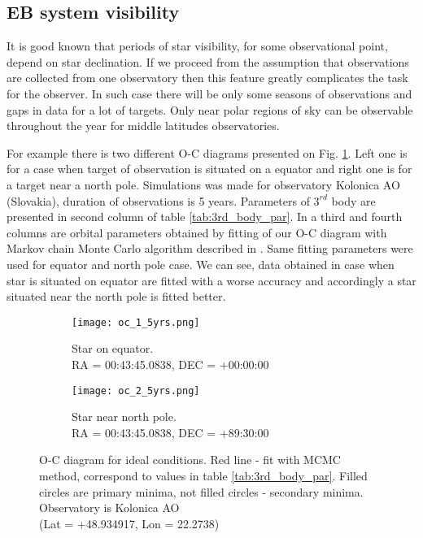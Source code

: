 \subsection{EB system visibility}

It is good known that periods of star visibility, for some observational point, depend on star declination.
If we proceed from the assumption that observations are collected from one observatory then this feature greatly complicates the task for the observer. In such case there will be only some seasons of observations and gaps in data for a lot of targets. Only near polar regions of sky can be observable throughout the year for middle latitudes observatories.

For example there is two different O-C diagrams presented on Fig. \ref{fig:oc_1}. Left one is for a case when 
target of observation is situated on a equator and right one is for a target near a north pole. Simulations was made for observatory Kolonica AO (Slovakia), duration of observations is 5 years. Parameters of $3^{rd}$ body are presented in second column of table \ref{tab:3rd_body_par}. In a third and fourth columns are orbital parameters obtained by fitting of our O-C diagram with Markov chain Monte Carlo algorithm described in \cite{Gajdos2019}. Same fitting parameters were used for equator and north pole case. We can see, data obtained in case when star is situated on equator are fitted with a worse accuracy and accordingly a star situated near the north pole is fitted better.

\begin{figure}[!h]
    \centering
    \begin{subfigure}[t]{0.5\textwidth}
        \centering
        \texttt{[image: oc\_1\_5yrs.png]}
        \caption{Star on equator.\\RA = 00:43:45.0838, DEC = +00:00:00}
    \end{subfigure}%
    \begin{subfigure}[t]{0.5\textwidth}
        \centering
        \texttt{[image: oc\_2\_5yrs.png]}
        \caption{Star near north pole.\\RA = 00:43:45.0838, DEC = +89:30:00}
    \end{subfigure}
    \caption{O-C diagram for ideal conditions. Red line - fit with MCMC method, correspond to values in table \ref{tab:3rd_body_par}. Filled circles are primary minima, not filled circles - secondary minima. 
    Observatory is Kolonica AO \\(Lat = +48.934917, Lon = 22.2738)}
\label{fig:oc_1}
\end{figure}


